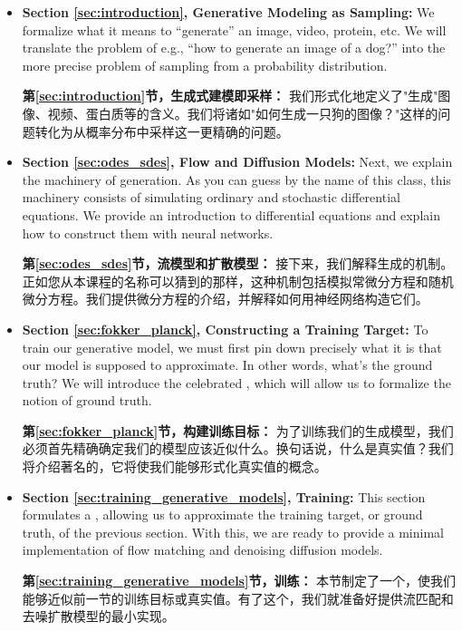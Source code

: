 \begin{itemize}
\item \textbf{\sffamily Section \ref{sec:introduction}, Generative Modeling as Sampling:} We formalize what it means to ``generate'' an image, video, protein, etc. We will translate the problem of e.g., ``how to generate an image of a dog?'' into the more precise problem of sampling from a probability distribution.

\textbf{\sffamily 第\ref{sec:introduction}节，生成式建模即采样：} 我们形式化地定义了"生成"图像、视频、蛋白质等的含义。我们将诸如"如何生成一只狗的图像？"这样的问题转化为从概率分布中采样这一更精确的问题。

\item \textbf{\sffamily Section \ref{sec:odes_sdes}, Flow and Diffusion Models:} Next, we explain the machinery of generation. As you can guess by the name of this class, this machinery consists of simulating ordinary and stochastic differential equations. We provide an introduction to differential equations and explain how to construct them with neural networks. 

\textbf{\sffamily 第\ref{sec:odes_sdes}节，流模型和扩散模型：} 接下来，我们解释生成的机制。正如您从本课程的名称可以猜到的那样，这种机制包括模拟常微分方程和随机微分方程。我们提供微分方程的介绍，并解释如何用神经网络构造它们。

\item \textbf{\sffamily Section \ref{sec:fokker_planck}, Constructing a Training Target:} To train our generative model, we must first pin down precisely what it is that our model is supposed to approximate. In other words, what's the ground truth? We will introduce the celebrated , which will allow us to formalize the notion of ground truth.

\textbf{\sffamily 第\ref{sec:fokker_planck}节，构建训练目标：} 为了训练我们的生成模型，我们必须首先精确确定我们的模型应该近似什么。换句话说，什么是真实值？我们将介绍著名的，它将使我们能够形式化真实值的概念。

\item \textbf{\sffamily Section \ref{sec:training_generative_models}, Training:} This section formulates a , allowing us to approximate the training target, or ground truth, of the previous section. With this, we are ready to provide a minimal implementation of flow matching and denoising diffusion models.

\textbf{\sffamily 第\ref{sec:training_generative_models}节，训练：} 本节制定了一个，使我们能够近似前一节的训练目标或真实值。有了这个，我们就准备好提供流匹配和去噪扩散模型的最小实现。


\end{itemize}
